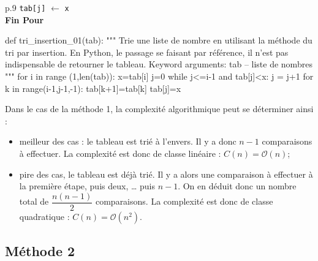 \documentclass[10pt,fleqn]{article} %
\newcommand{\tsf}[1]{\small{\texttt{#1}}}
\begin{document}
\begin{pseudo}
\begin{minipage}[c]{.48\linewidth}
\begin{tabular}{p{.9\textwidth}}
\hspace{.8cm} \tsf{tab[j]} $\leftarrow$ \tsf{x} \\
\hspace{.4cm} \textbf{Fin Pour} \\
\hline
\end{tabular}
\end{minipage}\hfill
\begin{minipage}[c]{.48\linewidth}
\begin{py}
\begin{python}
def tri_insertion_01(tab):
    """ 
    Trie une liste de nombre en utilisant la 
    méthode du tri par insertion.
    En Python, le passage se faisant par référence, 
    il n'est pas indispensable de retourner le tableau.
    Keyword arguments:
    tab -- liste de nombres
    """
    for i in range (1,len(tab)):
        x=tab[i]
        j=0
        while j<=i-1 and tab[j]<x:
            j = j+1
        for k in range(i-1,j-1,-1):
            tab[k+1]=tab[k]
        tab[j]=x
\end{python}
\end{py}
\end{minipage}

\end{pseudo}
 

Dans le cas de la méthode 1, la complexité algorithmique peut se déterminer ainsi : 
\begin{itemize}
\item meilleur des cas : le tableau est trié à l'envers. Il y a donc $n - 1$ comparaisons à effectuer. La complexité est donc de classe linéaire : $C(n)=\mathcal{O}(n)$;
\item pire des cas, le tableau est déjà trié. Il y a alors une comparaison à effectuer à la première étape, puis deux, … puis $n-1$. On en déduit donc un nombre total de $\dfrac{n\left(n-1\right)}{2}$ comparaisons. La complexité est donc de classe quadratique : $C(n)=\mathcal{O}\left(n^2\right)$.
\end{itemize}


\subsection{Méthode 2}
\end{document}
